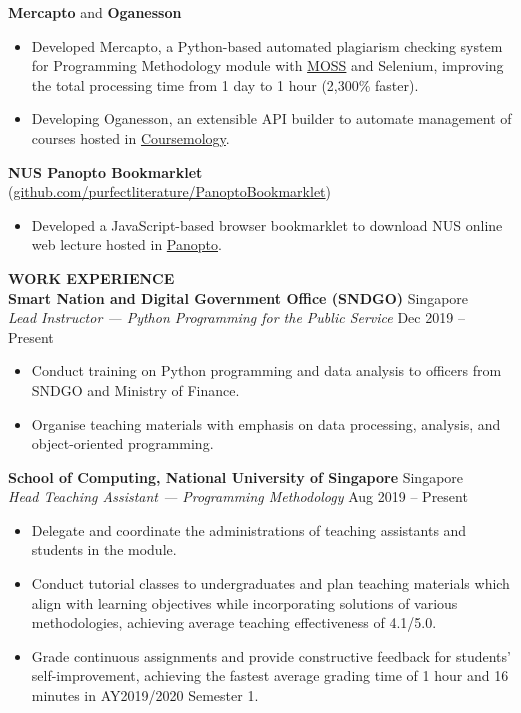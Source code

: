 \documentclass[a4paper, 11pt]{article}
\newcommand{\interspace}{\vspace{7pt}}
\newcommand{\intraspace}{\vspace{2pt}}
\begin{document}
	\intraspace

	\textbf{Mercapto} and \textbf{Oganesson}
	\begin{itemize}[leftmargin=*, noitemsep, topsep=0pt]
		\item Developed Mercapto, a Python-based automated plagiarism checking system for Programming Methodology module with \href{http://theory.stanford.edu/~aiken/moss/}{MOSS} and Selenium, improving the total processing time from 1 day to 1 hour (2,300\% faster).
		\item Developing Oganesson, an extensible API builder to automate management  of courses hosted in \href{https://coursemology.org}{Coursemology}.
	\end{itemize}

	\intraspace
	
	\textbf{NUS Panopto Bookmarklet} (\href{http://github.com/purfectliterature/PanoptoBookmarklet}{github.com/purfectliterature/PanoptoBookmarklet})
	\begin{itemize}[leftmargin=*, noitemsep, topsep=0pt]
		\item Developed a JavaScript-based browser bookmarklet to download NUS online web lecture hosted in \href{http://nuscast.ap.panopto.com}{Panopto}.
	\end{itemize}
	
	\interspace
	
	\textbf{\large WORK EXPERIENCE} \hrulefill \\
	\textbf{Smart Nation and Digital Government Office (SNDGO)} \hfill Singapore\\
	\textit{Lead Instructor --- Python Programming for the Public Service} \hfill Dec 2019 -- Present
	\begin{itemize}[leftmargin=*, noitemsep, topsep=0pt]
		\item Conduct training on Python programming and data analysis to officers from SNDGO and Ministry of Finance.
		\item Organise teaching materials with emphasis on data processing, analysis, and object-oriented programming.
	\end{itemize}

	\intraspace
	
	\textbf{School of Computing, National University of Singapore} \hfill Singapore\\
	\textit{Head Teaching Assistant --- Programming Methodology} \hfill Aug 2019 -- Present
	\begin{itemize}[leftmargin=*, noitemsep, topsep=0pt]
		\item Delegate and coordinate the administrations of teaching assistants and students in the module.
		\item Conduct tutorial classes to undergraduates and plan teaching materials which align with learning objectives while incorporating solutions of various methodologies, achieving average teaching effectiveness of 4.1/5.0.
		\item Grade continuous assignments and provide constructive feedback for students’ self-improvement, achieving the fastest average grading time of 1 hour and 16 minutes in AY2019/2020 Semester 1.
	\end{itemize}
	
\end{document}
